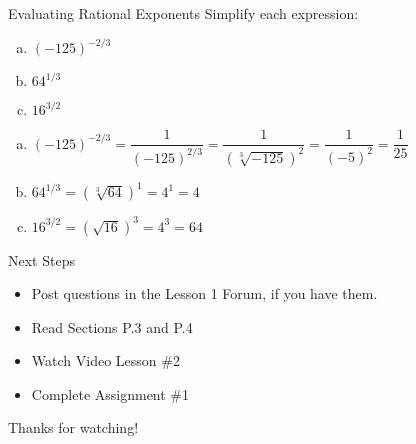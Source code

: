 \documentclass{beamer}
\newcommand{\fp}[1]{\left({#1}\right)} %
\begin{document}
\begin{frame}[t]{Evaluating Rational Exponents}
Simplify each expression:
\begin{enumerate}[(a)]
\item $(-125)^{-2/3}$
\item $64^{1/3}$
\item $16^{3/2}$
\end{enumerate}

\pause
\begin{enumerate}[(a)]
\item $(-125)^{-2/3} = \dfrac{1}{(-125)^{2/3}} = \dfrac{1}{\fp{\sqrt[3]{-125}}^2} = \dfrac{1}{(-5)^2} = \dfrac{1}{25}$ \pause
\item $64^{1/3} = \fp{\sqrt[3]{64}}^1 = 4^1 = 4$ \pause
\item $16^{3/2} = \fp{\sqrt{16}}^3 = 4^3 = 64$
\end{enumerate}

\end{frame}

\begin{frame}[t]{Next Steps}
\begin{itemize}
\item Post questions in the Lesson 1 Forum, if you have them.
\item Read Sections P.3 and P.4
\item Watch Video Lesson \#2
\item Complete Assignment \#1
\end{itemize}

\vfill

Thanks for watching!
\end{frame}
\end{document}
